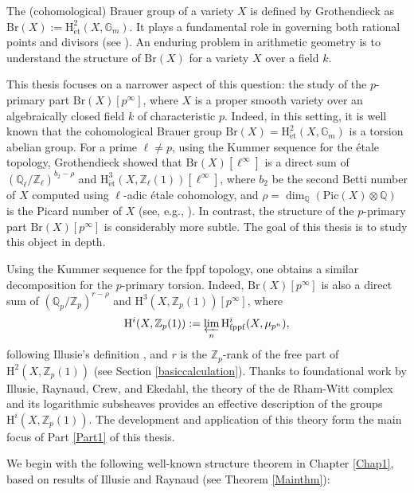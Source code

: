 \documentclass[a4paper,12pt,twoside]{report}
\newcommand{\Q}{\mathbb{Q}}
\newcommand{\Z}{\mathbb{Z}}
\newcommand{\G}{\mathbb{G}}
\newcommand{\fppf}{\mathrm{fppf}}
\newcommand{\et}{\mathrm{\acute{e}t}}
\newcommand{\Pic}{\mathrm{Pic}}
\newcommand{\Br}{\mathrm{Br}}
\newcommand{\HH}{\mathrm{H}}
\begin{document}
The (cohomological) Brauer group of a variety $X$ is defined by Grothendieck as $\Br(X):=\HH^2_{\et}(X,\G_m)$. 
It plays a fundamental role in governing both rational points and divisors (see \cite{CTS}). 
An enduring problem in arithmetic geometry is to understand the structure of $\Br(X)$ for a variety $X$ over a field $k$. 

This thesis focuses on a narrower aspect of this question: the study of
the $p$-primary part $\Br(X)[p^\infty]$, 
where $X$ is a proper smooth variety over an algebraically closed field $k$ of characteristic $p$. 
Indeed, in this setting, it is well known that the cohomological Brauer group 
$\Br(X)=\HH^2_{\et}(X,\G_m)$ is a torsion abelian group. For a prime $\ell\neq p$, 
using the Kummer sequence for the \'etale topology, Grothendieck showed that
$\Br(X)[\ell^\infty]$ is a direct sum of $(\Q_{\ell}/\Z_{\ell})^{b_2-\rho}$ 
and $\HH^3_{\et}(X,\Z_{\ell}(1))[\ell^\infty]$, where  $b_2$ be the second Betti number of $X$ 
computed using $\ell$-adic \'etale cohomology, and
$\rho=\dim_\Q(\Pic(X)\otimes\Q)$ is the Picard number of $X$ (see, e.g., \cite[Proposition 5.2.9]{CTS}). 
In contrast, the structure of the $p$-primary part $\Br(X)[p^\infty]$ is considerably more subtle. 
The goal of this thesis is to study this object in depth. 

Using the Kummer sequence for the fppf topology, one obtains a similar decomposition
for the $p$-primary torsion. Indeed, $\Br(X)[p^{\infty}]$ is also 
a direct sum of $(\Q_p/\Z_p)^{r-\rho}$ and $\HH^3(X,\Z_p(1))[p^\infty]$, 
where \begin{equation}\label{Zp1}
    \HH^i(X,\Z_p(1)):=\varprojlim_{n}\HH^i_{\fppf}(X,\mu_{p^n}),
\end{equation} 
following Illusie's definition \cite[Section II.5]{Il1}, and $r$ is the $\Z_p$-rank 
of the free part of $\HH^2(X,\Z_p(1))$ (see Section \ref{basiccalculation}).  
Thanks to foundational work by Illusie, Raynaud, Crew, and Ekedahl, the theory of the de Rham-Witt complex 
and its logarithmic subsheaves provides an effective description of the groups $\HH^i(X,\Z_p(1))$. 
The development and application of this theory form the main focus of Part \ref{Part1} of this thesis.

We begin with the following well-known structure theorem in Chapter \ref{Chap1}, based on results of Illusie and Raynaud (see Theorem \ref{Mainthm}): 
\end{document}
